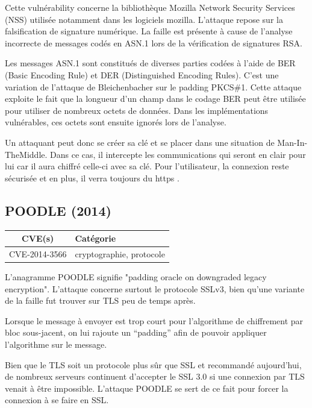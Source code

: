 Cette vulnérability concerne la bibliothèque Mozilla Network Security Services (NSS) utilisée notamment dans les logiciels mozilla. L'attaque repose sur la falsification de signature numérique. La faille est présente à cause de l'analyse incorrecte de messages codés en ASN.1 lors de la vérification de signatures RSA.

Les messages ASN.1 sont constitués de diverses parties codées à l'aide de BER (Basic Encoding Rule) et DER (Distinguished Encoding Rules). C'est une variation de l'attaque de Bleichenbacher sur le padding PKCS\#1. Cette attaque exploite le fait que la longueur d'un champ dans le codage BER peut être utilisée pour utiliser de nombreux octets de données. Dans les implémentations vulnérables, ces octets sont ensuite ignorés lors de l'analyse.

Un attaquant peut donc se créer sa clé et se placer dans une situation de Man-In-TheMiddle. Dans ce cas, il intercepte les communications qui seront en clair pour lui car il aura chiffré celle-ci avec sa clé. Pour l'utilisateur, la connexion reste sécurisée et en plus, il verra toujours du https \cite{berserk}.




\subsection{POODLE (2014)}

\begin{tabularx}{0.96\textwidth}{|c|X|}
  \hline
  \textbf{CVE(s)} & \textbf{Catégorie} \\
  \hline
  CVE-2014-3566 & cryptographie, protocole \\
  \hline
\end{tabularx}

\vspace{1em}

L'anagramme POODLE signifie "padding oracle on downgraded legacy encryption". L'attaque concerne surtout le protocole SSLv3, bien qu'une variante de la faille fut trouver sur TLS peu de temps après.

Lorsque le message à envoyer est trop court pour l'algorithme de chiffrement par bloc sous-jacent, on lui rajoute un ``padding'' afin de pouvoir appliquer l'algorithme sur le message.

Bien que le TLS soit un protocole plus sûr que SSL et recommandé aujourd'hui, de nombreux serveurs continuent d'accepter le SSL 3.0 si une connexion par TLS venait à être impossible. L'attaque POODLE se sert de ce fait pour forcer la connexion à se faire en SSL.


